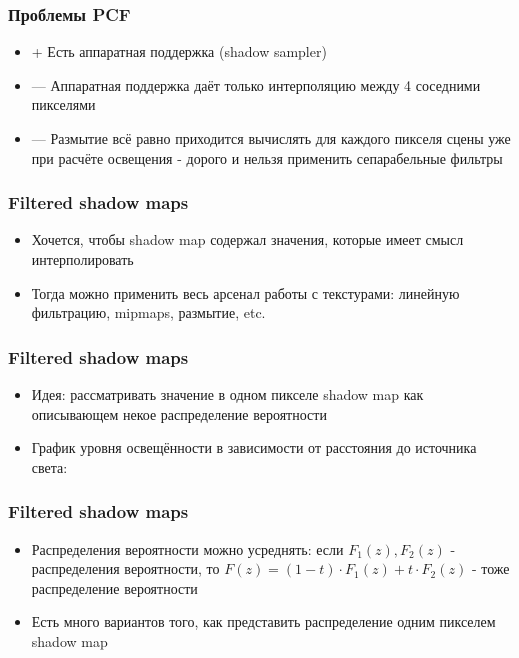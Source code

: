 \documentclass{beamer}
\begin{document}
\begin{frame}[fragile]
\frametitle{Проблемы PCF}
\begin{itemize}
\item {\color{green}+} Есть аппаратная поддержка (shadow sampler)
\item {\color{red}—} Аппаратная поддержка даёт только интерполяцию между 4 соседними пикселями
\item {\color{red}—} Размытие всё равно приходится вычислять для каждого пикселя сцены уже при расчёте освещения - дорого и нельзя применить сепарабельные фильтры
\end{itemize}
\end{frame}

\begin{frame}[fragile]
\frametitle{Filtered shadow maps}
\begin{itemize}
\item Хочется, чтобы shadow map содержал значения, которые имеет смысл интерполировать
\pause
\item Тогда можно применить весь арсенал работы с текстурами: линейную фильтрацию, mipmaps, размытие, etc.
\end{itemize}
\end{frame}

\begin{frame}[fragile]
\frametitle{Filtered shadow maps}
\begin{itemize}
\item Идея: рассматривать значение в одном пикселе shadow map как описывающем некое распределение вероятности
\pause
\item График уровня освещённости в зависимости от расстояния до источника света:
\end{itemize}
\begin{center}
\end{center}
\end{frame}

\begin{frame}[fragile]
\frametitle{Filtered shadow maps}
\begin{itemize}
\item Распределения вероятности можно усреднять: если \begin{math}F_1(z), F_2(z)\end{math} - распределения вероятности, то \begin{math}F(z) = (1 - t) \cdot F_1(z) + t \cdot F_2(z)\end{math} - тоже распределение вероятности
\pause
\item Есть много вариантов того, как представить распределение одним пикселем shadow map
\end{itemize}
\end{frame}
\end{document}
